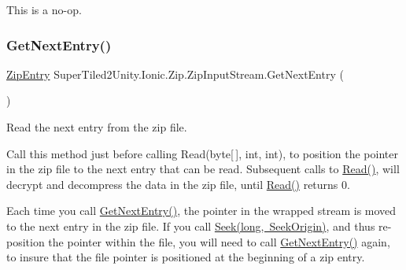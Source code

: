 This is a no-\/op. 

\mbox{\label{class_super_tiled2_unity_1_1_ionic_1_1_zip_1_1_zip_input_stream_afd108d06a4650f63b0ec80d0698fc886}} 
\subsubsection{\texorpdfstring{Get\+Next\+Entry()}{GetNextEntry()}}
{\footnotesize\ttfamily \mbox{\hyperlink{class_super_tiled2_unity_1_1_ionic_1_1_zip_1_1_zip_entry}{Zip\+Entry}} Super\+Tiled2\+Unity.\+Ionic.\+Zip.\+Zip\+Input\+Stream.\+Get\+Next\+Entry (\begin{DoxyParamCaption}{ }\end{DoxyParamCaption})}



Read the next entry from the zip file. 

Call this method just before calling Read(byte\mbox{[}$\,$\mbox{]}, int, int), to position the pointer in the zip file to the next entry that can be read. Subsequent calls to {\ttfamily \mbox{\hyperlink{class_super_tiled2_unity_1_1_ionic_1_1_zip_1_1_zip_input_stream_a172a23a02d3c7a34db7c6648c55fd299}{Read()}}}, will decrypt and decompress the data in the zip file, until {\ttfamily \mbox{\hyperlink{class_super_tiled2_unity_1_1_ionic_1_1_zip_1_1_zip_input_stream_a172a23a02d3c7a34db7c6648c55fd299}{Read()}}} returns 0. 

Each time you call {\ttfamily \mbox{\hyperlink{class_super_tiled2_unity_1_1_ionic_1_1_zip_1_1_zip_input_stream_afd108d06a4650f63b0ec80d0698fc886}{Get\+Next\+Entry()}}}, the pointer in the wrapped stream is moved to the next entry in the zip file. If you call \mbox{\hyperlink{class_super_tiled2_unity_1_1_ionic_1_1_zip_1_1_zip_input_stream_ab18b42888a3f6495b8afd7bc667edb5f}{Seek(long, Seek\+Origin)}}, and thus re-\/position the pointer within the file, you will need to call {\ttfamily \mbox{\hyperlink{class_super_tiled2_unity_1_1_ionic_1_1_zip_1_1_zip_input_stream_afd108d06a4650f63b0ec80d0698fc886}{Get\+Next\+Entry()}}} again, to insure that the file pointer is positioned at the beginning of a zip entry. 

